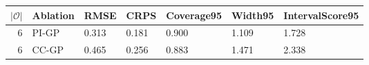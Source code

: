 
\begin{tabular}{rllllll}
\toprule
$|\mathcal O|$ & Ablation & RMSE & CRPS & Coverage95 & Width95 & IntervalScore95\\
\midrule
6 & PI-GP & 0.313 & 0.181 & 0.900 & 1.109 & 1.728\\
6 & CC-GP & 0.465 & 0.256 & 0.883 & 1.471 & 2.338\\
\bottomrule
\end{tabular}
